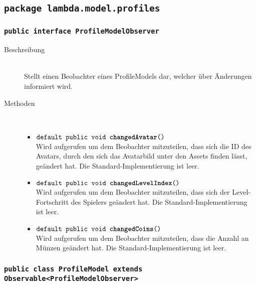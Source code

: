 \subsection{\texttt{package lambda.model.profiles}}

\subsubsection{\normalfont \texttt{public interface \textbf{ProfileModelObserver}}}

\begin{description}
\item[Beschreibung] \hfill \\ Stellt einen Beobachter eines ProfileModels dar, welcher über Änderungen informiert wird.

\item[Methoden] \hfill \\
	\vspace{-.8cm}
	\begin{itemize}
		\item $\texttt{default public void \textbf{changedAvatar}()}$ \\ Wird aufgerufen um dem Beobachter mitzuteilen, 
		dass sich die ID des Avatars, durch den sich das Avatarbild unter den Assets finden lässt, geändert hat. Die Standard-Implementierung ist leer.
		\item $\texttt{default public void \textbf{changedLevelIndex}()}$ \\ Wird aufgerufen um dem Beobachter mitzuteilen, 
		dass sich der Level-Fortschritt des Spielers geändert hat. Die Standard-Implementierung ist leer.
		\item $\texttt{default public void \textbf{changedCoins}()}$ \\ Wird aufgerufen um dem Beobachter mitzuteilen, 
		dass die Anzahl an Münzen geändert hat. Die Standard-Implementierung ist leer.
	\end{itemize}
\end{description}

\subsubsection{\normalfont \texttt{public class \textbf{ProfileModel} extends Observable<ProfileModelObserver>}}

